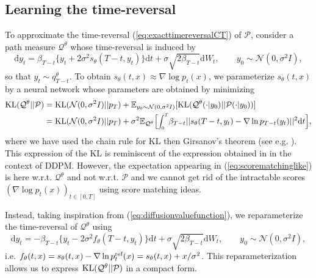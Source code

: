 \documentclass{article} %
\begin{document}
\subsection{Learning the time-reversal}
To approximate the time-reversal (\ref{eq:exacttimereversalCT}) of $\mathcal{P}$, consider a path measure $\mathcal{Q}^\theta$ whose time-reversal is induced by
\begin{equation}\label{eq:Qthetascore}
\mathrm{d}y_t=\beta_{T-t}\{y_t+2\sigma^2 s_{\theta}(T-t,y_t) \} \mathrm{d}t+\sigma \sqrt{2\beta_{T-t}}\mathrm{d}W_t,\qquad y_0  \sim \mathcal{N}(0,\sigma^2 I),
\end{equation}
so that $y_t \sim q^{\theta}_{T-t}$. To obtain $s_{\theta}(t,x) \approx \nabla \log p_t(x)$, we parameterize $s_{\theta}(t,x)$ by a neural network whose parameters are obtained by minimizing
\begin{align}\label{eq:scorematchinglike}
 \KL(\mathcal{Q}^\theta||\mathcal{P})&=\KL(\mathcal{N}(0,\sigma^2 I)||p_T)+\mathbb{E}_{y_0\sim \mathcal{N}(0,\sigma^2 I)}[\KL(\mathcal{Q}^\theta(\cdot |y_0)||\mathcal{P}(\cdot|y_0))]\\
    &=\KL(\mathcal{N}(0,\sigma^2 I)||p_T)+\sigma^2 \mathbb{E}_{\mathcal{Q}^\theta}\Bigr[\scaleobj{.8}{\int_0^T} \beta_{T-t}||s_\theta(T-t,y_t)-\nabla \log p_{T-t}(y_t)||^2 \mathrm{d}t \Bigr],\nonumber
\end{align}
where we have used the chain rule for KL then Girsanov's theorem (see e.g. \citep{klebaner2012introduction}). This expression of the KL is reminiscent of the expression obtained in \cite[Theorem 1]{song2021maximum} in the context of DDPM. However, the expectation appearing in (\ref{eq:scorematchinglike}) is here w.r.t. $\mathcal{Q}^\theta$ and not w.r.t.  $\mathcal{P}$ and we cannot get rid of the intractable scores $(\nabla \log p_{t}(x))_{t \in [0,T]}$ using score matching ideas.

Instead, taking inspiration from (\ref{eq:diffusionvaluefunction}), we reparameterize the time-reversal of  $\mathcal{Q}^\theta$ using
\begin{equation}\label{eq:approximatetimereversalCT}
    \mathrm{d}y_t=-\beta_{T-t}\{y_t -2\sigma^2 f_{\theta}(T-t,y_t)\} \mathrm{d}t+\sigma \sqrt{2\beta_{T-t}} \mathrm{d}W_t,\qquad y_0 \sim \mathcal{N}(0,\sigma^2 I),
\end{equation}
i.e. $f_\theta(t,x)=s_\theta(t,x)-\nabla \log p^{\textup{ref}}_t(x)=s_{\theta}(t,x)+x/\sigma^2$. This reparameterization allows us to express  $\KL(\mathcal{Q}^\theta||\mathcal{P})$ in a compact form.
\end{document}
